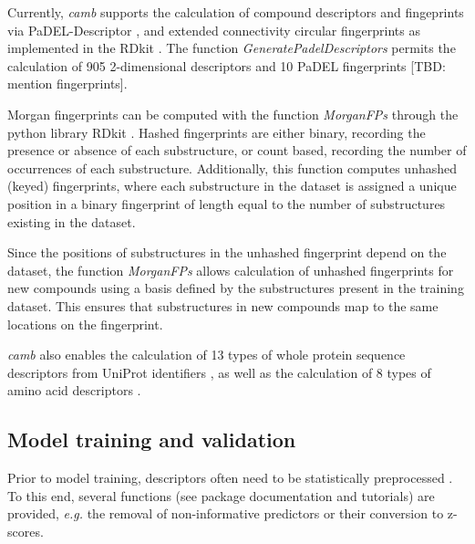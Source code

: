\documentclass{bioinfo}
\begin{document}
Currently, {\it camb} supports the calculation of compound descriptors and fingeprints via PaDEL-Descriptor \citep{padel},
and extended connectivity circular fingerprints \citep{extended_fp} as implemented in the RDkit \citep{rdkit}.
The function {\it GeneratePadelDescriptors} permits the calculation of 905 2-dimensional descriptors and 10 PaDEL fingerprints [TBD: mention fingerprints].

Morgan fingerprints can be computed with the function {\it MorganFPs}
through the python library RDkit \citep{rdkit}.
Hashed fingerprints are either binary, recording the presence or absence of each substructure,
 or count based, recording the number of occurrences of each substructure.
Additionally, this function computes unhashed (keyed) fingerprints, 
where each substructure in the dataset is assigned a unique position in a binary fingerprint of length equal to the number of substructures existing in the dataset.

Since the positions of substructures in the unhashed fingerprint depend on the dataset, the function {\it MorganFPs} allows calculation of unhashed fingerprints for new compounds using a basis defined by the substructures present in the training dataset. This ensures that substructures in new compounds map to the same locations on the fingerprint.

{\it camb} also enables the calculation of 13 types of whole protein sequence descriptors
from UniProt identifiers \citep{protr},
as well as the calculation of 8 types of amino acid descriptors \citep{AA_benchmark}.

\subsection{Model training and validation}

Prior to model training, descriptors often need to be statistically preprocessed \citep{andersson}.
To this end, several functions (see package documentation and tutorials)
are provided, {\it e.g.} the removal of non-informative predictors or
their conversion to z-scores.
\end{document}
